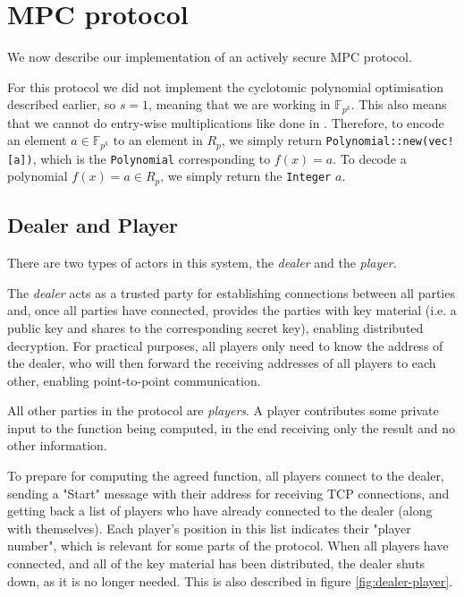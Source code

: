 \documentclass[../main.tex]{subfiles}
\begin{document}
\section{MPC protocol}
We now describe our implementation of an actively secure MPC protocol.

For this protocol we did not implement the cyclotomic polynomial optimisation described earlier, so $s = 1$, meaning that we are working in $\mathbb{F}_{p^k}$.
This also means that we cannot do entry-wise multiplications like done in \cite{damgaard2012multiparty}.
Therefore, to encode an element $a \in \mathbb{F}_{p^k}$ to an element in $R_p$, we simply return \lstinline{Polynomial::new(vec![a])}, which is the \lstinline{Polynomial} corresponding to $f(x) = a$. To decode a polynomial $f(x) = a \in R_p$, we simply return the \lstinline{Integer} $a$.

\subsection{Dealer and Player}

There are two types of actors in this system, the \textit{dealer} and the \textit{player}.

The \textit{dealer} acts as a trusted party for establishing connections between all parties and, once all parties have connected, provides the parties with key material (i.e. a public key and shares to the corresponding secret key), enabling distributed decryption.
For practical purposes, all players only need to know the address of the dealer, who will then forward the receiving addresses of all players to each other, enabling point-to-point communication.

All other parties in the protocol are \textit{players}.
A player contributes some private input to the function being computed, in the end receiving only the result and no other information.

To prepare for computing the agreed function, all players connect to the dealer, sending a "Start" message with their address for receiving TCP connections, and getting back a list of players who have already connected to the dealer (along with themselves).
Each player's position in this list indicates their "player number", which is relevant for some parts of the protocol.
When all players have connected, and all of the key material has been distributed, the dealer shuts down, as it is no longer needed.
This is also described in figure \ref{fig:dealer-player}.
\end{document}
